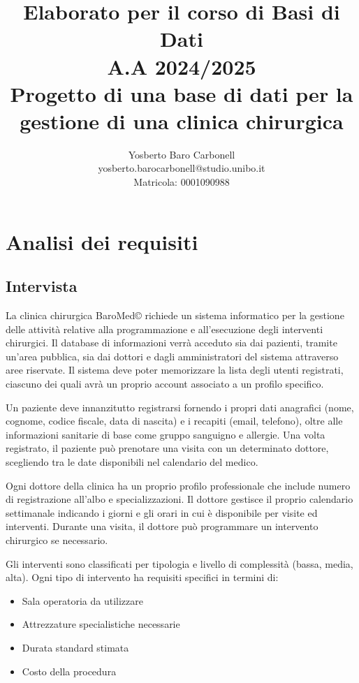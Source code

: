 \documentclass[12pt,a4paper]{report}
\title{{\Huge Elaborato per il corso di Basi di Dati}\\[1cm]
       {\Large A.A 2024/2025}\\[1cm]
       {\Large Progetto di una base di dati per la gestione di una clinica chirurgica}}
\author{Yosberto Baro Carbonell\\[0.5cm]
        yosberto.barocarbonell@studio.unibo.it\\
        Matricola: 0001090988
        }
\date{}
\begin{document}
\maketitle

\tableofcontents

\chapter{Analisi dei requisiti}

\section{Intervista}
La clinica chirurgica BaroMed© richiede un sistema informatico per la gestione delle attività relative alla programmazione e all'esecuzione degli interventi chirurgici. Il database di informazioni verrà acceduto sia dai pazienti, tramite un'area pubblica, sia dai dottori e dagli amministratori del sistema attraverso aree riservate. Il sistema deve poter memorizzare la lista degli utenti registrati, ciascuno dei quali avrà un proprio account associato a un profilo specifico.

Un paziente deve innanzitutto registrarsi fornendo i propri dati anagrafici (nome, cognome, codice fiscale, data di nascita) e i recapiti (email, telefono), oltre alle informazioni sanitarie di base come gruppo sanguigno e allergie. Una volta registrato, il paziente può prenotare una visita con un determinato dottore, scegliendo tra le date disponibili nel calendario del medico.

Ogni dottore della clinica ha un proprio profilo professionale che include numero di registrazione all'albo e specializzazioni. Il dottore gestisce il proprio calendario settimanale indicando i giorni e gli orari in cui è disponibile per visite ed interventi. Durante una visita, il dottore può programmare un intervento chirurgico se necessario.

Gli interventi sono classificati per tipologia e livello di complessità (bassa, media, alta). Ogni tipo di intervento ha requisiti specifici in termini di:
\begin{itemize}
\item Sala operatoria da utilizzare
\item Attrezzature specialistiche necessarie
\item Durata standard stimata
\item Costo della procedura
\end{itemize}
\end{document}
